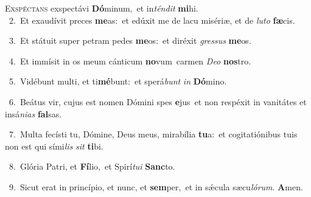 \lettrine{\initial\textcolor{\initialcolor}{E}}{xspéctans} exspectávi \textbf{Dó}\-minum,~\star et in\-\textit{tén}\-\textit{dit} \textbf{mi}\-hi.\\
{\numbfont\textcolor{\numbcolor}{~2.}}~Et exaudívit preces \textbf{me}\-as:~\star et edúxit me de lacu misériæ, et de \textit{lu}\-\textit{to} \textbf{fæ}\-cis.\par
{\numbfont\textcolor{\numbcolor}{~3.}}~Et státuit super petram pedes \textbf{me}\-os:~\star et diréxit \textit{gres}\-\textit{sus} \textbf{me}\-os.\par
{\numbfont\textcolor{\numbcolor}{~4.}}~Et immísit in os meum cánticum \textbf{no}\-vum~\star carmen \textit{De}\-\textit{o} \textbf{nos}\-tro.\par
{\numbfont\textcolor{\numbcolor}{~5.}}~Vidébunt multi, et ti\-\textbf{mé}\-bunt:~\star et sperá\textit{bunt} \textit{in} \textbf{Dó}\-mino.\par
{\numbfont\textcolor{\numbcolor}{~6.}}~Beátus vir, cujus est nomen Dómini spes \textbf{e}\-jus~\star et non respéxit in vanitátes et insá\-\textit{ni}\-\textit{as} \textbf{fal}\-sas.\par
{\numbfont\textcolor{\numbcolor}{~7.}}~Multa fecísti tu, Dómine, Deus meus, mirabília \textbf{tu}\-a:~\star et cogitatiónibus tuis non est qui sími\textit{lis} \textit{sit} \textbf{ti}\-bi.\par
{\numbfont\textcolor{\numbcolor}{~8.}}~Glória Patri, et \textbf{Fí}\-lio,~\star et Spirí\-\textit{tu}\-\textit{i} \textbf{Sanc}\-to.\par
{\numbfont\textcolor{\numbcolor}{~9.}}~Sicut erat in princípio, et nunc, et \textbf{sem}\-per,~\star et in sǽcula sæcu\-\textit{ló}\-\textit{rum}. \textbf{A}\-men.\par
